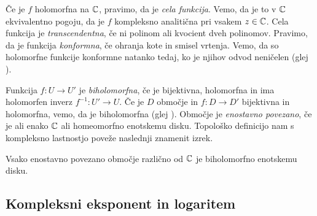 Če je \(f\) holomorfna na \(\mathbb C\), pravimo, da je \emph{cela funkcija}. Vemo, da je to v \(\mathbb C\) ekvivalentno pogoju, da je \(f\) kompleksno analitična pri vsakem \(z \in \mathbb C\). Cela funkcija je \emph{transcendentna}, če ni polinom ali kvocient dveh polinomov. Pravimo, da je funkcija \emph{konformna}, če ohranja kote in smisel vrtenja. Vemo, da so holomorfne funkcije konformne natanko tedaj, ko je njihov odvod neničelen (glej \cite[izrek 78]{Globevnik_2010}).

Funkcija \(f \colon U \to U'\) je \emph{biholomorfna}, če je bijektivna, holomorfna in ima holomorfen inverz \(f^{-1} \colon U' \to U\). Če je \(D\) območje in \(f \colon D \to D'\) bijektivna in holomorfna, vemo, da je biholomorfna (glej \cite[izrek 77]{Globevnik_2010}). Območje je \emph{enostavno povezano}, če je ali enako \(\mathbb C\) ali homeomorfno enotskemu disku. Topološko definicijo nam s kompleksno lastnostjo poveže naslednji znamenit izrek.

\begin{izrek}
    Vsako enostavno povezano območje različno od \(\mathbb C\) je biholomorfno enotskemu disku.
\end{izrek}

\subsection{Kompleksni eksponent in logaritem}

